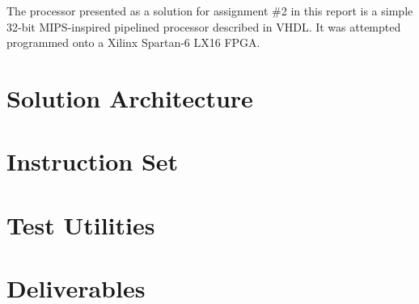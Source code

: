 The processor presented as a solution for assignment \#2 in this report is a simple 32-bit MIPS-inspired pipelined processor described in VHDL.
It was attempted programmed onto a Xilinx Spartan-6 LX16 FPGA.

\section{Solution Architecture}



\section{Instruction Set}
\label{section:instruction-set}

 \label{sec:instruction-set}

\section{Test Utilities}



\section{Deliverables}


